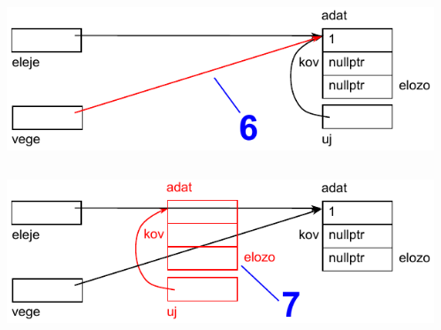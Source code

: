\begin{frame}
  \begin{columns}[c]
      \scriptsize
      \begin{exampleblock}{}
        \vspace{-.2cm}
        
        \vspace{-.2cm}
      \end{exampleblock}
      \includegraphics[width=\textwidth]{sor/sor07.pdf}
  \end{columns}
\end{frame}

\begin{frame}
  \begin{columns}[c]
      \scriptsize
      \begin{exampleblock}{}
        \vspace{-.2cm}
        
        \vspace{-.2cm}
      \end{exampleblock}
      \includegraphics[width=\textwidth]{sor/sor08.pdf}
  \end{columns}
\end{frame}


